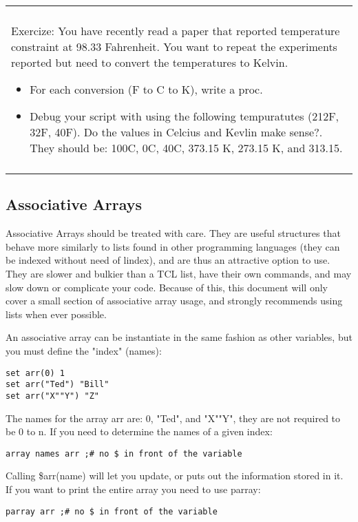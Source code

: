 \documentclass[letter,11pt]{article}
\newenvironment{exercise}
    {\begin{center}
    \begin{tabular}{|p{0.9\textwidth}|}
    \hline\\
    }
    { 
    \\\\\hline
    \end{tabular} 
    \end{center}
    }
\begin{document}
\begin{exercise} 
Exercize: You have recently read a paper that reported temperature constraint at  98.33 Fahrenheit. You want to repeat the experiments reported but need to convert the temperatures to Kelvin. 
\begin{itemize}
\item For each conversion (F to C to K), write a proc.
\item Debug your script with using the following tempuratutes (212F, 32F, 40F). Do the values in Celcius and Kevlin make sense?. They should be: 100C, 0C, 40C, 373.15 K, 273.15 K, and 313.15.
\end{itemize}


\end{exercise}

\subsection{Associative Arrays}
\label{AArray}

Associative Arrays should be treated with care. They are useful structures that behave more similarly to lists found in other programming languages (they can be indexed without need of lindex), and are thus an attractive option to use. They are slower and bulkier than a TCL list, have their own commands, and may slow down or complicate your code. Because of this, this document will only cover a small section of associative array usage, and strongly recommends using lists when ever possible.

An associative array can be instantiate in the same fashion as other variables, but you must define the "index" (names):

\begin{lstlisting}
set arr(0) 1
set arr("Ted") "Bill"
set arr("X""Y") "Z"
\end{lstlisting}

The names for the array arr are: 0, "Ted", and "X""Y", they are not required to be 0 to n. If you need to determine the names of a given index:

\begin{lstlisting}
array names arr ;# no $ in front of the variable
\end{lstlisting}

Calling \$arr(name) will let you update, or puts out the information stored in it. If you want to print the entire array you need to use parray:

\begin{lstlisting}
parray arr ;# no $ in front of the variable
\end{lstlisting}
\end{document}

